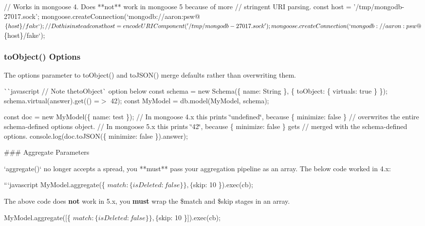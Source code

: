 \begin{DoxyCode}
// Works in mongoose 4. Does **not** work in mongoose 5 because of more
// stringent URI parsing.
const host = '/tmp/mongodb-27017.sock';
mongoose.createConnection(`mongodb://aaron:psw@$\{host\}/fake`);

// Do this instead
const host = encodeURIComponent('/tmp/mongodb-27017.sock');
mongoose.createConnection(`mongodb://aaron:psw@$\{host\}/fake`);
\end{DoxyCode}


\subsubsection*{{\ttfamily to\+Object()} Options}

The {\ttfamily options} parameter to {\ttfamily to\+Object()} and {\ttfamily to\+J\+S\+O\+N()} merge defaults rather than overwriting them.

\`{}\`{}{\ttfamily javascript // Note the}to\+Object\`{} option below const schema = new Schema(\{ name\+: String \}, \{ to\+Object\+: \{ virtuals\+: true \} \}); schema.\+virtual(\textquotesingle{}answer\textquotesingle{}).get(() =$>$ 42); const My\+Model = db.\+model(\textquotesingle{}My\+Model\textquotesingle{}, schema);

const doc = new My\+Model(\{ name\+: \textquotesingle{}test\textquotesingle{} \}); // In mongoose 4.\+x this prints \char`\"{}undefined\char`\"{}, because {\ttfamily \{ minimize\+: false \}} // overwrites the entire schema-\/defined options object. // In mongoose 5.\+x this prints \char`\"{}42\char`\"{}, because {\ttfamily \{ minimize\+: false \}} gets // merged with the schema-\/defined options. console.\+log(doc.\+to\+J\+S\+ON(\{ minimize\+: false \}).answer); 
\begin{DoxyCode}
### Aggregate Parameters

`aggregate()` no longer accepts a spread, you **must** pass your aggregation pipeline as an array. The
       below code worked in 4.x:

```javascript
MyModel.aggregate(\{ $match: \{ isDeleted: false \} \}, \{ $skip: 10 \}).exec(cb);
\end{DoxyCode}


The above code does {\bfseries not} work in 5.\+x, you {\bfseries must} wrap the {\ttfamily \$match} and {\ttfamily \$skip} stages in an array.


\begin{DoxyCode}
MyModel.aggregate([\{ $match: \{ isDeleted: false \} \}, \{ $skip: 10 \}]).exec(cb);
\end{DoxyCode}


